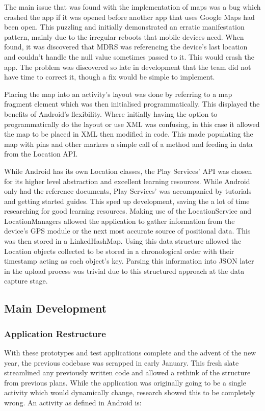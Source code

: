\documentclass{l3proj}
\begin{document}
The main issue that was found with the implementation of maps was a bug which crashed the app if it was opened before another app that uses Google Maps had been open. This puzzling and initially demonstrated an erratic manifestation pattern, mainly due to the irregular reboots that mobile devices need. When found, it was discovered that MDRS was referencing the device's last location and couldn't handle the null value sometimes passed to it. This would crash the app. The problem was discovered so late in development that the team did not have time to correct it, though a fix would be simple to implement.

Placing the map into an activity's layout was done by referring to a map fragment element which was then initialised programmatically. This displayed the benefits of Android's flexibility. Where initially having the option to programmatically do the layout or use XML was confusing, in this case it allowed the map to be placed in XML then modified in code. This made populating the map with pins and other markers a simple call of a method and feeding in data from the Location API.

While Android has its own Location classes, the Play Services' API was chosen for its higher level abstraction and excellent learning resources. While Android only had the reference documents, Play Services' was accompanied by tutorials and getting started guides. This sped up development, saving the a lot of time researching for good learning resources. Making use of the LocationService and LocationManagers allowed the application to gather information from the device's GPS module or the next most accurate source of positional data. This was then stored in a LinkedHashMap. Using this data structure allowed the Location objects collected to be stored in a chronological order with their timestamp acting as each object's key. Parsing this information into JSON later in the upload process was trivial due to this structured approach at the data capture stage.

\subsection{Main Development}
\subsubsection{Application Restructure}
With these prototypes and test applications complete and the advent of the new year, the previous codebase was scrapped in early January. This fresh slate streamlined any previously written code and allowed a rethink of the structure from previous plans. While the application was originally going to be a single activity which would dynamically change, research showed this to be completely wrong. An activity as defined in Android is:
\end{document}
